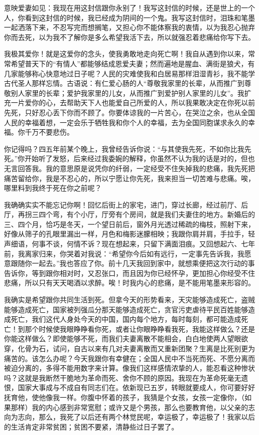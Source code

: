 \documentclass[12pt,UTF-8,openany,a4]{ctexbook}
\begin{document}
\begin{large}
    \yiwen 
    意映爱妻如见：我现在用这封信跟你永别了！我写这封信的时候，还是世上的一个人，你看到这封信的时候，我已经成为阴间的一个鬼。我写这封信时，泪珠和笔墨一起洒落下来，不忍写完而想搁笔，又担心你不能体察我的衷情，以为我忍心抛弃你而去死，以为我不了解你是多么希望我活下去，所以就强忍着悲痛给你写下去。
    
    我极其爱你！就是这爱你的念头，使我勇敢地走向死亡啊！我自从遇到你以来，常常希望普天下的“有情人”都能够结成恩爱夫妻；然而遍地是腥血、满街是狼犬，有几家能够称心快意地过日子呢？人民的灾难使我和白居易那样泪湿青衫，我不能学古代圣人那样忘情。古语说：有仁爱心肠的人“尊敬我家里的长辈，从而推广到尊敬别人家里的长辈；爱护我家里的儿女，从而推广到爱护别人家里的儿女”。我扩充一片爱你的心，去帮助天下人也能爱自己所爱的人，所以我果敢决定在你死以前先死，只好忍心丢下你而不顾了。你要体谅我的一片苦心，在哭泣之余，也从全国人民的幸福着想，一定会乐于牺牲我和你个人的幸福，去为全国同胞谋求永久的幸福。你千万不要悲伤。
    
    你记得吗？四五年前某个晚上，我曾经告诉你说：“与其使我先死，不如你比我先死。”你开始听了发怒，后来经过我委婉的解释，你虽然不认为我的话是对的，但也无言回答我。我的意思原是说凭你的纤弱，一定经受不住失掉我的悲痛，我先死把痛苦留给你，我是不忍心的，所以宁愿让你先死，我来担当一切苦难与悲痛。唉，哪里料到我终于死在你之前呢？
    
    我确确实实不能忘记你啊！回忆后街上的家宅，进门，穿过长廊，经过前厅、后厅，再拐三四个弯，有个小厅，厅旁有个房间，就是我们夫妻住的地方。新婚后的三、四个月，恰巧是冬天，一个望日前后，窗外月光透过稀疏的梅枝，照射下来，好像从筛子的孔眼里漏出一样，月色和梅影迷朦相映；我跟你肩并肩，手拉手，轻声细语，何事不谈，何情不诉？现在想起来，只留下满面泪痕。又回想起六、七年前，我离家归来，你哭着对我说：“希望你今后如有远行，一定事先告诉我，我愿意跟随你一起去。”我也答应了你。前十几天我回到家中，就想乘便把这次行动的事告诉你，等到跟你相对时，又忍张口，而且因为你已经怀孕，更加担心你经受不住悲痛，所以只有天天喝酒以求醉。唉！时我内心的悲痛，是不能用笔墨来形容的。
    
    我确实是希望跟你共同生活到死。但拿今天的形势看来，天灾能够造成死亡，盗贼能够造成死亡，国家被列强瓜分那天能够造成死亡，贪官污吏虐待平民百姓能够造成死亡，我们这代人身处今天的中国，国内每个地方，每时每刻，都可能造成死亡！到那个时候使我眼睁睁看你死，或者让你眼睁睁看我死，我能这样做么？还是你能这样做么？即使能够不死，而我们夫妻离散不能相会，白白地使两人望眼欲穿，化骨为石，试问，自古以来有几对夫妻离散而又重新团聚？生离是比死别更为痛苦的。该怎么办呢？今天我跟你有幸健在；全国人民中不当死而死、不愿分离而被迫分离的，多得不能用数字来计算。像我们这样感情浓挚的人，能忍看这种惨状吗？这就是我断然干脆地为革命而死、舍你不顾的原因。我现在为革命死毫无遗恨，国家大事成与不成自有同志们在。依新现已五岁，转眼就要成人，你可要好好抚育他，使他像我一样。你腹中怀着的孩子，我猜是个女孩，女孩一定像你，（如果那样）我的内心感到非常宽慰；或许又是个男孩，那么也要教育他，以父亲的志向为志向，那么，我死了以后还有两个林觉民呢，幸运极了，幸运极了！我家以后的生活肯定非常贫困；贫困不要紧，清静些过日子罢了。
    

\end{large}
\end{document}
